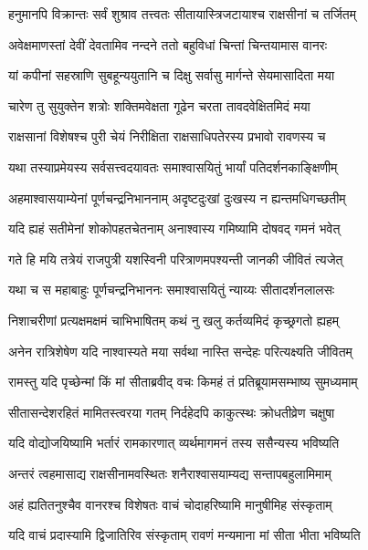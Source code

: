 
\twolineshloka
{हनुमानपि विक्रान्तः सर्वं शुश्राव तत्त्वतः}
{सीतायास्त्रिजटायाश्च राक्षसीनां च तर्जितम्} %

\twolineshloka
{अवेक्षमाणस्तां देवीं देवतामिव नन्दने}
{ततो बहुविधां चिन्तां चिन्तयामास वानरः} %

\twolineshloka
{यां कपीनां सहस्राणि सुबहून्ययुतानि च}
{दिक्षु सर्वासु मार्गन्ते सेयमासादिता मया} %

\twolineshloka
{चारेण तु सुयुक्तेन शत्रोः शक्तिमवेक्षता}
{गूढेन चरता तावदवेक्षितमिदं मया} %

\twolineshloka
{राक्षसानां विशेषश्च पुरी चेयं निरीक्षिता}
{राक्षसाधिपतेरस्य प्रभावो रावणस्य च} %

\twolineshloka
{यथा तस्याप्रमेयस्य सर्वसत्त्वदयावतः}
{समाश्वासयितुं भार्यां पतिदर्शनकाङ्क्षिणीम्} %

\twolineshloka
{अहमाश्वासयाम्येनां पूर्णचन्द्रनिभाननाम्}
{अदृष्टदुःखां दुःखस्य न ह्यन्तमधिगच्छतीम्} %

\twolineshloka
{यदि ह्यहं सतीमेनां शोकोपहतचेतनाम्}
{अनाश्वास्य गमिष्यामि दोषवद् गमनं भवेत्} %

\twolineshloka
{गते हि मयि तत्रेयं राजपुत्री यशस्विनी}
{परित्राणमपश्यन्ती जानकी जीवितं त्यजेत्} %

\twolineshloka
{यथा च स महाबाहुः पूर्णचन्द्रनिभाननः}
{समाश्वासयितुं न्याय्यः सीतादर्शनलालसः} %

\twolineshloka
{निशाचरीणां प्रत्यक्षमक्षमं चाभिभाषितम्}
{कथं नु खलु कर्तव्यमिदं कृच्छ्रगतो ह्यहम्} %

\twolineshloka
{अनेन रात्रिशेषेण यदि नाश्वास्यते मया}
{सर्वथा नास्ति सन्देहः परित्यक्ष्यति जीवितम्} %

\twolineshloka
{रामस्तु यदि पृच्छेन्मां किं मां सीताब्रवीद् वचः}
{किमहं तं प्रतिब्रूयामसम्भाष्य सुमध्यमाम्} %

\twolineshloka
{सीतासन्देशरहितं मामितस्त्वरया गतम्}
{निर्दहेदपि काकुत्स्थः क्रोधतीव्रेण चक्षुषा} %

\twolineshloka
{यदि वोद्योजयिष्यामि भर्तारं रामकारणात्}
{व्यर्थमागमनं तस्य ससैन्यस्य भविष्यति} %

\twolineshloka
{अन्तरं त्वहमासाद्य राक्षसीनामवस्थितः}
{शनैराश्वासयाम्यद्य सन्तापबहुलामिमाम्} %

\twolineshloka
{अहं ह्यतितनुश्चैव वानरश्च विशेषतः}
{वाचं चोदाहरिष्यामि मानुषीमिह संस्कृताम्} %

\twolineshloka
{यदि वाचं प्रदास्यामि द्विजातिरिव संस्कृताम्}
{रावणं मन्यमाना मां सीता भीता भविष्यति} %

